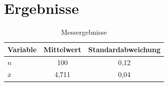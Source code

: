 \section{Ergebnisse}
\label{sec:ergebnisse}

\begin{table}[htbp]
  \centering
  \caption{Messergebnisse}
  \label{tab:messung}
  \begin{tabular}{lSS}
    \toprule
    Variable & {Mittelwert} & {Standardabweichung} \\
    \midrule
    $n$ & 100 & 0{,}12 \\
    $\bar{x}$ & 4{,}711 & 0{,}04 \\
    \bottomrule
  \end{tabular}
\end{table}

